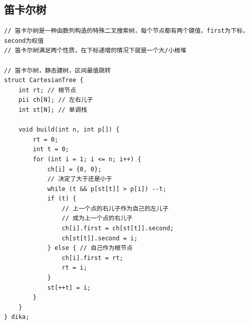 \documentclass[twoside]{article}
\begin{document}
\subsection{笛卡尔树}
\begin{lstlisting}
// 笛卡尔树是一种由数列构造的特殊二叉搜索树，每个节点都有两个键值，first为下标，second为权值
// 笛卡尔树满足两个性质，在下标递增的情况下就是一个大/小根堆

// 笛卡尔树，静态建树，区间最值跳转
struct CartesianTree {
    int rt; // 根节点
    pii ch[N]; // 左右儿子
    int st[N]; // 单调栈

    void build(int n, int p[]) {
        rt = 0;
        int t = 0;
        for (int i = 1; i <= n; i++) {
            ch[i] = {0, 0};
            // 决定了大于还是小于
            while (t && p[st[t]] > p[i]) --t;
            if (t) { 
                // 上一个点的右儿子作为自己的左儿子
				// 成为上一个点的右儿子
                ch[i].first = ch[st[t]].second;
                ch[st[t]].second = i;
            } else { // 自己作为根节点
                ch[i].first = rt;
                rt = i;
            }
            st[++t] = i;
        }
    }
} dika;\end{lstlisting}
\end{document}
